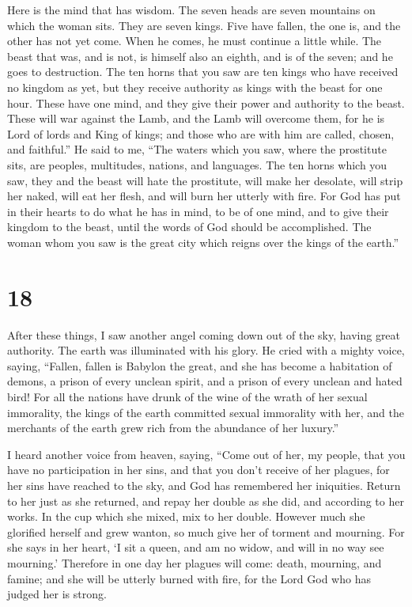  Here is the mind that has wisdom. The seven heads are seven
mountains on which the woman sits.  They are seven kings.
Five have fallen, the one is, and the other has not yet come. When he
comes, he must continue a little while.  The beast that
was, and is not, is himself also an eighth, and is of the seven; and he
goes to destruction.  The ten horns that you saw are ten
kings who have received no kingdom as yet, but they receive authority as
kings with the beast for one hour.  These have one mind,
and they give their power and authority to the beast. 
These will war against the Lamb, and the Lamb will overcome them, for he
is Lord of lords and King of kings; and those who are with him are
called, chosen, and faithful.''  He said to me, ``The
waters which you saw, where the prostitute sits, are peoples,
multitudes, nations, and languages.  The ten horns which
you saw, they and the beast will hate the prostitute, will make her
desolate, will strip her naked, will eat her flesh, and will burn her
utterly with fire.  For God has put in their hearts to do
what he has in mind, to be of one mind, and to give their kingdom to the
beast, until the words of God should be accomplished.  The
woman whom you saw is the great city which reigns over the kings of the
earth.''

\hypertarget{section-17}{%
\section{18}\label{section-17}}

 After these things, I saw another angel coming down out of
the sky, having great authority. The earth was illuminated with his
glory.  He cried with a mighty voice, saying, ``Fallen,
fallen is Babylon the great, and she has become a habitation of demons,
a prison of every unclean spirit, and a prison of every unclean and
hated bird!  For all the nations have drunk of the wine of
the wrath of her sexual immorality, the kings of the earth committed
sexual immorality with her, and the merchants of the earth grew rich
from the abundance of her luxury.''

 I heard another voice from heaven, saying, ``Come out of
her, my people, that you have no participation in her sins, and that you
don't receive of her plagues,  for her sins have reached to
the sky, and God has remembered her iniquities.  Return to
her just as she returned, and repay her double as she did, and according
to her works. In the cup which she mixed, mix to her double.
 However much she glorified herself and grew wanton, so much
give her of torment and mourning. For she says in her heart, `I sit a
queen, and am no widow, and will in no way see mourning.' 
Therefore in one day her plagues will come: death, mourning, and famine;
and she will be utterly burned with fire, for the Lord God who has
judged her is strong.

